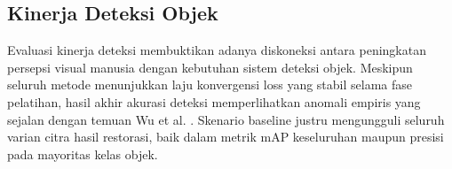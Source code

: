 \documentclass[conference]{IEEEtran}
\begin{document}
\begin{table}[htbp]
\centering
\caption{Kuantifikasi Kualitas Citra dan Degradasi Fitur Spasial}
\label{tab:image_quality}
\end{table}


\subsection{Kinerja Deteksi Objek}
Evaluasi kinerja deteksi membuktikan adanya diskoneksi antara peningkatan persepsi visual manusia dengan kebutuhan sistem deteksi objek. Meskipun seluruh metode menunjukkan laju konvergensi loss yang stabil selama fase pelatihan, hasil akhir akurasi deteksi memperlihatkan anomali empiris yang sejalan dengan temuan Wu et al. \cite{wu2024llieeffect}. Skenario baseline justru mengungguli seluruh varian citra hasil restorasi, baik dalam metrik mAP keseluruhan maupun presisi pada mayoritas kelas objek.
\end{document}
